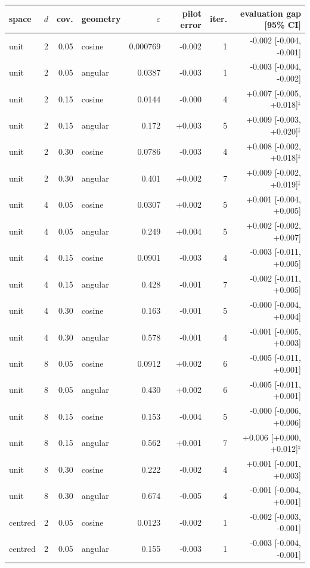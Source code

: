 \begin{tabular}{lrrlrrrr}
\toprule
space & $d$ & cov. & geometry & $\varepsilon$ & pilot error & iter. & evaluation gap [95\% CI] \\
\midrule
unit & 2 & 0.05 & cosine & 0.000769 & -0.002 & 1 & -0.002 [-0.004, -0.001] \\
unit & 2 & 0.05 & angular & 0.0387 & -0.003 & 1 & -0.003 [-0.004, -0.002] \\
unit & 2 & 0.15 & cosine & 0.0144 & -0.000 & 4 & +0.007 [-0.005, +0.018]$^{\ddagger}$ \\
unit & 2 & 0.15 & angular & 0.172 & +0.003 & 5 & +0.009 [-0.003, +0.020]$^{\ddagger}$ \\
unit & 2 & 0.30 & cosine & 0.0786 & -0.003 & 4 & +0.008 [-0.002, +0.018]$^{\ddagger}$ \\
unit & 2 & 0.30 & angular & 0.401 & +0.002 & 7 & +0.009 [-0.002, +0.019]$^{\ddagger}$ \\
unit & 4 & 0.05 & cosine & 0.0307 & +0.002 & 5 & +0.001 [-0.004, +0.005] \\
unit & 4 & 0.05 & angular & 0.249 & +0.004 & 5 & +0.002 [-0.002, +0.007] \\
unit & 4 & 0.15 & cosine & 0.0901 & -0.003 & 4 & -0.003 [-0.011, +0.005] \\
unit & 4 & 0.15 & angular & 0.428 & -0.001 & 7 & -0.002 [-0.011, +0.005] \\
unit & 4 & 0.30 & cosine & 0.163 & -0.001 & 5 & -0.000 [-0.004, +0.004] \\
unit & 4 & 0.30 & angular & 0.578 & -0.001 & 4 & -0.001 [-0.005, +0.003] \\
unit & 8 & 0.05 & cosine & 0.0912 & +0.002 & 6 & -0.005 [-0.011, +0.001] \\
unit & 8 & 0.05 & angular & 0.430 & +0.002 & 6 & -0.005 [-0.011, +0.001] \\
unit & 8 & 0.15 & cosine & 0.153 & -0.004 & 5 & -0.000 [-0.006, +0.006] \\
unit & 8 & 0.15 & angular & 0.562 & +0.001 & 7 & +0.006 [+0.000, +0.012]$^{\ddagger}$ \\
unit & 8 & 0.30 & cosine & 0.222 & -0.002 & 4 & +0.001 [-0.001, +0.003] \\
unit & 8 & 0.30 & angular & 0.674 & -0.005 & 4 & -0.001 [-0.004, +0.001] \\
centred & 2 & 0.05 & cosine & 0.0123 & -0.002 & 1 & -0.002 [-0.003, -0.001] \\
centred & 2 & 0.05 & angular & 0.155 & -0.003 & 1 & -0.003 [-0.004, -0.001] \\

\end{tabular}
